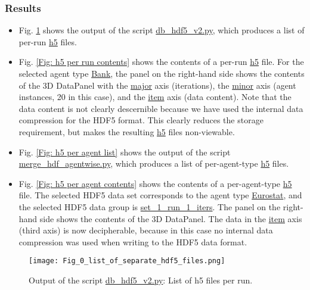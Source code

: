 \documentclass[10pt,a4paper]{article}
\begin{document}
\subsubsection{Results}

\begin{itemize}
\item Fig. \ref{Fig: h5 per run list} shows the output of the script \url{db_hdf5_v2.py}, which produces a list of per-run \url{h5} files.

\item Fig. \ref{Fig: h5 per run contents} shows the contents of a per-run \url{h5} file. For the selected agent type \url{Bank}, the panel on the right-hand side shows the contents of the 3D DataPanel with the \url{major} axis (iterations), the \url{minor} axis (agent instances, 20 in this case), and the \url{item} axis (data content). Note that the data content is not clearly descernible because we have used the internal data compression for the HDF5 format. This clearly reduces the storage requirement, but makes the resulting \url{h5} files non-viewable.

\item Fig. \ref{Fig: h5 per agent list} shows the output of the script \url{merge_hdf_agentwise.py}, which produces a list of per-agent-type \url{h5} files.

\item Fig. \ref{Fig: h5 per agent contents} shows the contents of a per-agent-type \url{h5} file. The selected HDF5 data set corresponds to the agent type \url{Eurostat}, and the selected HDF5 data group is \url{set_1_run_1_iters}. The panel on the right-hand side shows the contents of the 3D DataPanel. The data in the \url{item} axis (third axis) is now decipherable, because in this case no internal data compression was used when writing to the HDF5 data format.
\end{itemize}


\begin{figure}[htb!]
\centering\leavevmode
\graphicspath{{./hdf5_snapshots/}}
%
\centering\leavevmode
\texttt{[image: Fig\_0\_list\_of\_separate\_hdf5\_files.png]} 
\label{Fig: h5 per run list}
\caption{\footnotesize Output of the script \url{db_hdf5_v2.py}: List of h5 files per run.}
\end{figure}
\end{document}
